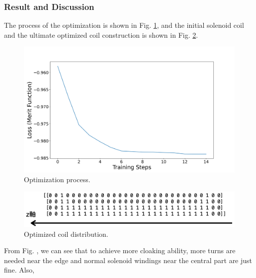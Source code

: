 \subsubsection{Result and Discussion}
The process of the optimization is shown in Fig. \ref{fig:optimizedCoilTrainingSteps},
and the initial solenoid coil and the ultimate optimized coil construction is shown in Fig. \ref{fig:optimizedCoilConstruction}.
\begin{figure}[H]
  \includegraphics[width=18cm, bb=9 9 900 550]{./section4Optimal/averageLosses.png}
  \caption{Optimization process.}
  \label{fig:optimizedCoilTrainingSteps}
\end{figure}
\begin{figure}[H]
  \includegraphics[width=18cm, bb=9 9 900 200]{./section4Optimal/optimizedCoilDistribution.png}
  \caption{Optimized coil distribution.}
  \label{fig:optimizedCoilConstruction}
\end{figure}
From Fig. \label{fig:optimizedCoilConstruction}, we can see that to achieve more cloaking ability,
more turns are needed near the edge and normal solenoid windings near the central part are just fine.
Also,

